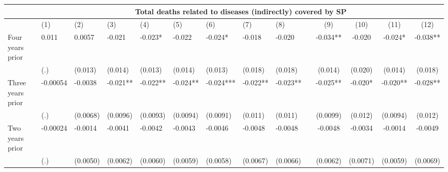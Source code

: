 \begin{tabular}{lccccrrrrrcccc}
\toprule
      & \multicolumn{13}{c}{Total deaths related to diseases (indirectly) covered by SP} \\
\midrule
      & \multicolumn{1}{l}{(1)} & \multicolumn{1}{l}{(2)} & \multicolumn{1}{l}{(3)} & \multicolumn{1}{l}{(4)} & \multicolumn{1}{l}{(5)} & \multicolumn{1}{l}{(6)} & \multicolumn{1}{l}{(7)} & \multicolumn{1}{l}{(8)} &       & (9)   & (10)  & (11)  & (12) \\
\midrule
\midrule
Four years prior & \multicolumn{1}{l}{0.011} & \multicolumn{1}{l}{0.0057} & \multicolumn{1}{l}{-0.021} & \multicolumn{1}{l}{-0.023*} & \multicolumn{1}{l}{-0.022} & \multicolumn{1}{l}{-0.024*} & \multicolumn{1}{l}{-0.018} & \multicolumn{1}{l}{-0.020} &       & -0.034** & -0.020 & -0.024* & -0.038** \\
      & \multicolumn{1}{l}{(.)} & \multicolumn{1}{l}{(0.013)} & \multicolumn{1}{l}{(0.014)} & \multicolumn{1}{l}{(0.013)} & \multicolumn{1}{l}{(0.014)} & \multicolumn{1}{l}{(0.013)} & \multicolumn{1}{l}{(0.018)} & \multicolumn{1}{l}{(0.018)} &       & (0.014) & (0.020) & (0.014) & (0.018) \\
Three years prior & \multicolumn{1}{l}{-0.00054} & \multicolumn{1}{l}{-0.0038} & \multicolumn{1}{l}{-0.021**} & \multicolumn{1}{l}{-0.022**} & \multicolumn{1}{l}{-0.024**} & \multicolumn{1}{l}{-0.024***} & \multicolumn{1}{l}{-0.022**} & \multicolumn{1}{l}{-0.023**} &       & -0.025** & -0.020* & -0.020** & -0.028** \\
      & \multicolumn{1}{l}{(.)} & \multicolumn{1}{l}{(0.0068)} & \multicolumn{1}{l}{(0.0096)} & \multicolumn{1}{l}{(0.0093)} & \multicolumn{1}{l}{(0.0094)} & \multicolumn{1}{l}{(0.0091)} & \multicolumn{1}{l}{(0.011)} & \multicolumn{1}{l}{(0.011)} &       & (0.0099) & (0.012) & (0.0094) & (0.012) \\
Two years prior & \multicolumn{1}{l}{-0.00024} & \multicolumn{1}{l}{-0.0014} & \multicolumn{1}{l}{-0.0041} & \multicolumn{1}{l}{-0.0042} & \multicolumn{1}{l}{-0.0043} & \multicolumn{1}{l}{-0.0046} & \multicolumn{1}{l}{-0.0048} & \multicolumn{1}{l}{-0.0048} &       & -0.0048 & -0.0034 & -0.0014 & -0.0049 \\
      & \multicolumn{1}{l}{(.)} & \multicolumn{1}{l}{(0.0050)} & \multicolumn{1}{l}{(0.0062)} & \multicolumn{1}{l}{(0.0060)} & \multicolumn{1}{l}{(0.0059)} & \multicolumn{1}{l}{(0.0058)} & \multicolumn{1}{l}{(0.0067)} & \multicolumn{1}{l}{(0.0066)} &       & (0.0062) & (0.0071) & (0.0059) & (0.0069) \\

\end{tabular}
